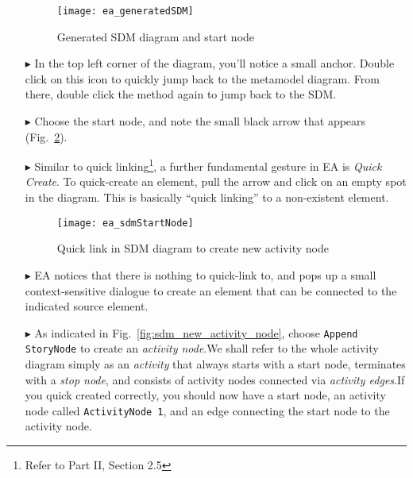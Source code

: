 \begin{itemize}
\begin{figure}[htp]
\begin{center}
  \texttt{[image: ea\_generatedSDM]}
  \caption{Generated SDM diagram and start node}  
  \label{fig:sdm_skeleton}
\end{center}
\end{figure}

\item[$\blacktriangleright$] In the top left corner of the diagram, you'll notice a small anchor. Double click on this icon to quickly jump back to the
metamodel diagram. From there, double click the method again to jump back to the SDM.

\item[$\blacktriangleright$] Choose the start node, and note the small black arrow that appears (Fig.~\ref{fig:sdm_quicklink}). 

\item[$\blacktriangleright$] Similar to quick linking\footnote{Refer to Part II, Section 2.5}, a further fundamental gesture in EA is \emph{Quick Create}. To
quick-create an element, pull the arrow and click on an empty spot in the diagram. This is basically ``quick linking'' to a non-existent element.

\begin{figure}[htp]
\begin{center}
  \texttt{[image: ea\_sdmStartNode]}
  \caption{Quick link in SDM diagram to create new activity node}  
  \label{fig:sdm_quicklink}
\end{center}
\end{figure}

\item[$\blacktriangleright$] EA notices that there is nothing to quick-link to, and pops up a small context-sensitive dialogue to create an element that can be
connected to the indicated source element.

\newpage

\item[$\blacktriangleright$] As indicated in Fig.~\ref{fig:sdm_new_activity_node}, choose \texttt{Append StoryNode} to create an \emph{activity
node}.We shall refer to the whole activity diagram simply as an \emph{activity} that always starts with a start node,
terminates with a \emph{stop node}, and consists of activity nodes connected via \emph{activity edges}.If you quick created correctly,
you should now have a start node, an activity node called \texttt{ActivityNode 1}, and an edge connecting the start node to the activity node.


\end{itemize}
